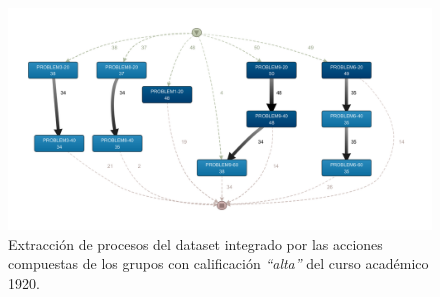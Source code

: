 \begin{figure}[H]
    \centering
    \includegraphics[width=1.25\textwidth]{imagenes/DISCO_compound/Year1920HighGrades.png}
    \caption{Extracción de procesos del dataset integrado por las acciones compuestas de los grupos con calificación \emph{``alta''} del curso académico 1920.}
    \label{fig:year1920BestGrades}
\end{figure}